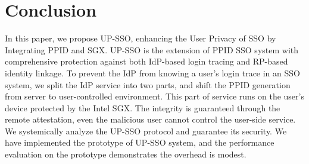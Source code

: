 \section{Conclusion}
\label{sec:conclusion}
In this paper, we propose UP-SSO, enhancing the User Privacy of SSO by Integrating PPID and SGX.
UP-SSO is the extension of PPID SSO system with comprehensive protection against both IdP-based login tracing and RP-based identity linkage. To prevent the IdP from knowing a user's login trace in an SSO system, we split the IdP service into two parts, and shift the PPID generation from server to user-controlled environment.
This part of service runs on the user's device protected by the Intel SGX. The integrity is guaranteed through the remote attestation, even the malicious user cannot control the user-side service. 
We systemically analyze the UP-SSO protocol and guarantee its security. 
We have implemented the prototype of UP-SSO system, and the performance evaluation on the prototype demonstrates the  overhead is modest. 
